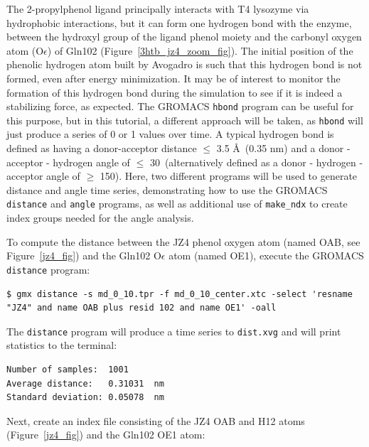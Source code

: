 \documentclass[9pt,tutorial,pubversion]{livecoms}
\begin{document}
The 2-propylphenol ligand principally interacts with T4 lysozyme via hydrophobic interactions, but it can form one hydrogen bond with the enzyme, between the hydroxyl group of the ligand phenol moiety and the carbonyl oxygen atom (O$\epsilon$) of Gln102 (Figure~\ref{3htb_jz4_zoom_fig}). The initial position of the phenolic hydrogen atom built by Avogadro is such that this hydrogen bond is not formed, even after energy minimization. It may be of interest to monitor the formation of this hydrogen bond during the simulation to see if it is indeed a stabilizing force, as expected. The GROMACS \texttt{hbond} program can be useful for this purpose, but in this tutorial, a different approach will be taken, as \texttt{hbond} will just produce a series of 0 or 1 values over time. A typical hydrogen bond is defined as having a donor-acceptor distance $\le$ 3.5 \AA~(0.35 nm) and a donor - acceptor - hydrogen angle of $\le$ 30\textdegree~(alternatively defined as a donor - hydrogen - acceptor angle of $\ge$ 150\textdegree). Here, two different programs will be used to generate distance and angle time series, demonstrating how to use the GROMACS \texttt{distance} and \texttt{angle} programs, as well as additional use of \texttt{make\_ndx} to create index groups needed for the angle analysis.

To compute the distance between the JZ4 phenol oxygen atom (named OAB, see Figure~\ref{jz4_fig}) and the Gln102 O$\epsilon$ atom (named OE1), execute the GROMACS \texttt{distance} program:

\begin{lstlisting}
$ gmx distance -s md_0_10.tpr -f md_0_10_center.xtc -select 'resname "JZ4" and name OAB plus resid 102 and name OE1' -oall
\end{lstlisting}

The \texttt{distance} program will produce a time series to \texttt{dist.xvg} and will print statistics to the terminal:

\begin{lstlisting}
Number of samples:  1001
Average distance:   0.31031  nm
Standard deviation: 0.05078  nm
\end{lstlisting}

Next, create an index file consisting of the JZ4 OAB and H12 atoms (Figure~\ref{jz4_fig}) and the Gln102 OE1 atom:
\end{document}

